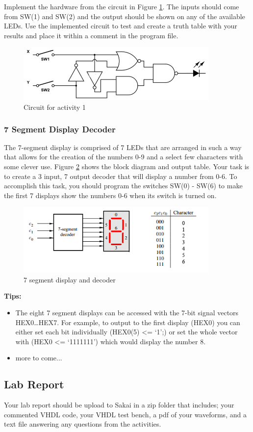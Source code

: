 Implement the hardware from the circuit in Figure \ref{fig:circuit1}. The inputs should come from SW(1) and SW(2) and the output should be shown on any of the available LEDs. Use the implemented circuit to test and create a truth table with your results and place it within a comment in the program file.

\begin{figure}[H]
	\centering
	\includegraphics[width=100mm]{Lab1/figures/circuit1.png}
	\caption{Circuit for activity 1}
	\label{fig:circuit1}
\end{figure}

\subsubsection{7 Segment Display Decoder}

The 7-segment display is comprised of 7 LEDs that are arranged in such a way that allows for the creation of the numbers 0-9 and a select few characters with some clever use. Figure \ref{fig:7seg} shows the block diagram and output table. Your task is to create a 3 input, 7 output decoder that will display a number from 0-6. To accomplish this task, you should program the switches SW(0) - SW(6) to make the first 7 displays show the numbers 0-6 when its switch is turned on.

\begin{figure}[H]
	\centering
	\includegraphics[width=100mm]{Lab1/figures/7seg.png}
	\caption{7 segment display and decoder}
	\label{fig:7seg}
\end{figure}

{\bf Tips:} 
\begin{itemize}
  \item The eight 7 segment displays can be accessed with the 7-bit signal vectors HEX0\ldots HEX7. For example, to output to the first display (HEX0) you can either set each bit individually (HEX0(5) <= `1';) or set the whole vector with (HEX0 <= `1111111') which would display the number 8. 
\item more to come...
\end{itemize}

\subsection{Lab Report}

Your lab report should be upload to Sakai in a zip folder that includes; your commented VHDL code, your VHDL test bench, a pdf of your waveforms, and a text file answering any questions from the activities.


